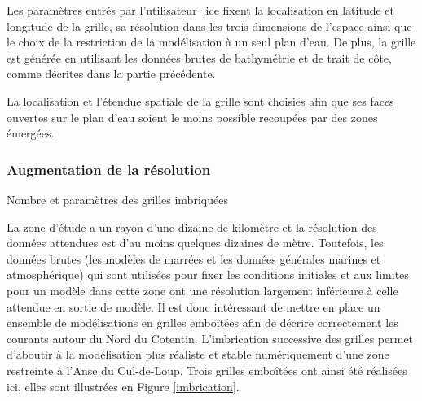 \documentclass[10pt,a4paper,titlepage]{article}
\begin{document}
Les paramètres entrés par l'utilisateur·ice fixent la localisation en latitude et longitude de la grille, sa résolution dans les trois dimensions de l'espace ainsi que le choix de la restriction de la modélisation à un seul plan d'eau.
De plus, la grille est générée en utilisant les données brutes de bathymétrie et de trait de côte, comme décrites dans la partie précédente.

La localisation et l'étendue spatiale de la grille sont choisies afin que ses faces ouvertes sur le plan d'eau soient le moins possible recoupées par des zones émergées.

\subsubsection{Augmentation de la résolution}
{\color{lightgrey}
    Nombre et paramètres des grilles imbriquées
}

La zone d'étude a un rayon d'une dizaine de kilomètre et la résolution des données attendues est d'au moins quelques dizaines de mètre.
Toutefois, les données brutes (les modèles de marrées et les données générales marines et atmosphérique) qui sont utilisées pour fixer les conditions initiales et aux limites pour un modèle dans cette zone ont une résolution largement inférieure à celle attendue en sortie de modèle.
Il est donc intéressant de mettre en place un ensemble de modélisations en grilles emboîtées afin de décrire correctement les courants autour du Nord du Cotentin.
L'imbrication successive des grilles permet d'aboutir à la modélisation plus réaliste et stable numériquement d'une zone restreinte à l'Anse du Cul-de-Loup.
Trois grilles emboîtées ont ainsi été réalisées ici, elles sont illustrées en Figure \ref{imbrication}.
\end{document}
